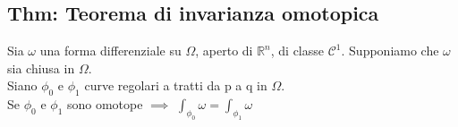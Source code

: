 \documentclass{article} %
\begin{document}
    \subsection*{Thm: Teorema di invarianza omotopica}
    Sia $\omega$ una forma differenziale su $\Omega$, aperto di $\mathbb{R}^n$, di classe $\mathcal{C}^1$. Supponiamo che $\omega$ sia chiusa in $\Omega$. \\
    Siano $\phi_0$ e $\phi_1$ curve regolari a tratti da p a q in $\Omega$. \\
    Se $\phi_0$ e $\phi_1$ sono omotope $\implies$ $\int_{\phi_0} \omega = \int_{\phi_1} \omega$
\end{document}
